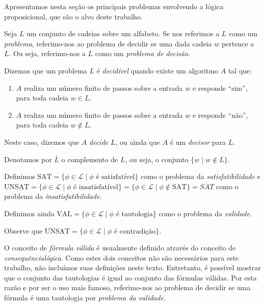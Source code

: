 \indent

Apresentamos nesta seção os principais problemas envolvendo a lógica proposicional, que são o alvo deste trabalho.

\begin{definition}
	Seja $L$ um conjunto de cadeias sobre um alfabeto. Se nos referimos a $L$ como um \emph{problema}, referimo-nos ao problema de decidir se uma dada cadeia $w$ pertence a $L$. Ou seja, referimo-nos a $L$ como um \emph{problema de decisão}.
	
	Dizemos que um problema $L$ é \emph{decidível} quando existe um algoritmo $A$ tal que:
	\begin{enumerate}
		\item $A$ realiza um número finito de passos sobre a entrada $w$ e responde ``sim'', para toda cadeia $w \in L$.
		\item $A$ realiza um número finito de passos sobre a entrada $w$ e responde ``não'', para toda cadeia $w \notin L$.
	\end{enumerate}
	Neste caso, dizemos que $A$ \emph{decide} $L$, ou ainda que $A$ é um \emph{decisor} para $L$.
	
	Denotamos por $\overline{L}$ o complemento de $L$, ou seja, o conjunto $\{w \mid w \notin L \}$.
\end{definition}

\begin{definition}
	Definimos $\text{SAT} = \{\phi \in \mathcal{L} \mid \phi \text{ é satisfatível} \}$ como o problema da \emph{satisfatibilidade} e $\text{UNSAT} = \{\phi \in \mathcal{L} \mid \phi \text{ é insatisfatível} \} = \{\phi \in \mathcal{L} \mid \phi \notin \text{SAT} \} = \overline{SAT}$ como o problema da \emph{insatisfatibilidade}.
	
	Definimos ainda $\text{VAL} = \{\phi \in \mathcal{L} \mid \phi \text{ é tautologia} \}$ como o problema da \emph{validade}.
	
	Observe que $\text{UNSAT} = \{\phi \in \mathcal{L} \mid \phi \text{ é contradição} \}$.
\end{definition}

O conceito de \emph{fórmula válida} é usualmente definido através do conceito de \emph{consequência\break lógica}. Como estes dois conceitos não são necessários para este trabalho, não incluímos suas definições neste texto. Entretanto, é possível mostrar que o conjunto das tautologias é igual ao conjunto das fórmulas válidas. Por esta razão e por ser o uso mais famoso, referimo-nos ao problema de decidir se uma fórmula é uma tautologia por \emph{problema da validade}.

